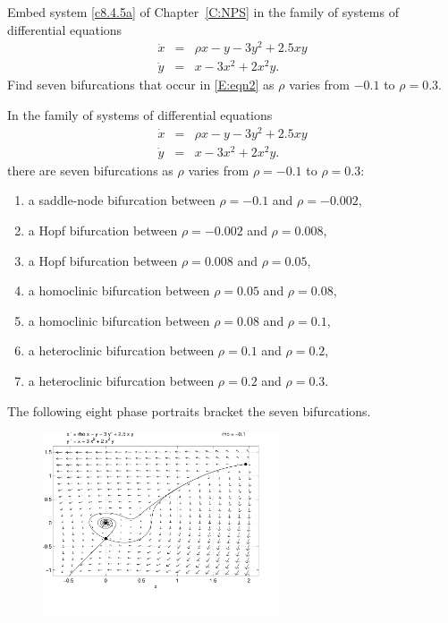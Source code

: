 \documentclass{ximera}
\begin{document}
\begin{computerExercise} \label{c9.6.6}
Embed system \eqref{c8.4.5a} of Chapter~\ref{C:NPS} in the family of systems of 
differential equations 
\begin{equation} \label{E:eqn2}
\begin{array}{rcl}
\dot{x} & = & \rho x-y-3y^2+2.5xy\\
\dot{y} & = & x-3x^2+2x^2y.
\end{array}
\end{equation}
Find seven bifurcations that occur in \eqref{E:eqn2} as $\rho$ varies from 
$-0.1$ to $\rho=0.3$. 

\begin{solution}

\soln In the family of systems of differential equations  
\[
\begin{array}{rcl}
\dot{x} & = & \rho x-y-3y^2+2.5xy\\
\dot{y} & = & x-3x^2+2x^2y.
\end{array}
\]
there are seven bifurcations as $\rho$ varies from $\rho=-0.1$ to $\rho=0.3$:  
\begin{enumerate}
\item	a saddle-node bifurcation between $\rho=-0.1$ and $\rho=-0.002$,
\item	a Hopf bifurcation between $\rho=-0.002$ and $\rho=0.008$,
\item	a Hopf bifurcation between $\rho=0.008$ and $\rho=0.05$,
\item	a homoclinic bifurcation between $\rho=0.05$ and $\rho=0.08$,
\item	a homoclinic bifurcation between $\rho=0.08$ and $\rho=0.1$,
\item	a heteroclinic bifurcation between $\rho=0.1$ and $\rho=0.2$,
\item	a heteroclinic bifurcation between $\rho=0.2$ and $\rho=0.3$.
\end{enumerate}
The following eight phase portraits bracket the seven bifurcations.
\begin{figure}[htb]
     \centerline{%
     \includegraphics[width=2.75in]{exfigure/pr3-M1.pdf}     
}
\end{figure}
\end{solution}
\end{computerExercise}
\end{document}
